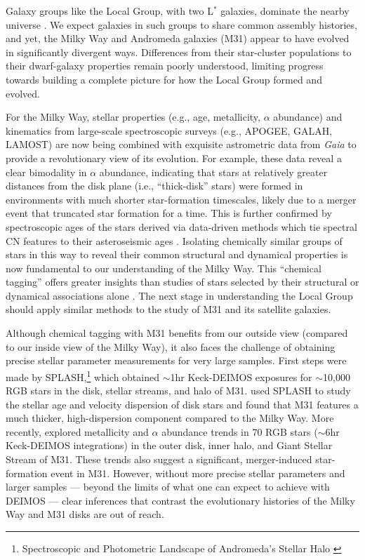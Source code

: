 \documentclass[11pt,a4paper,twoside,onecolumn,openany,final,oldfontcommands]{memoir}
\begin{document}
Galaxy groups like the Local Group, with two L$^*$ galaxies, dominate the nearby universe \citep{kourkchi17}.  We expect galaxies in such groups to share common assembly histories, and yet, the Milky Way and Andromeda galaxies (M31) appear to have evolved in significantly divergent ways.  Differences from their star-cluster populations to their dwarf-galaxy properties remain poorly understood, limiting progress towards building a complete picture for how the Local Group formed and evolved.

For the Milky Way, stellar properties (e.g., age, metallicity, $\alpha$ abundance) and kinematics from large-scale spectroscopic surveys (e.g., APOGEE, GALAH, LAMOST) are now being combined with exquisite astrometric data from \textit{Gaia} to provide a revolutionary view of its evolution.  For example, these data reveal a clear bimodality in $\alpha$ abundance, indicating that stars at relatively greater distances from the disk plane (i.e., ``thick-disk'' stars) were formed in environments with much shorter star-formation timescales, likely due to a merger event that truncated star formation for a time. This is further confirmed by spectroscopic ages of the stars derived via data-driven methods which tie spectral CN features to their asteroseismic ages \citep[e.g.][]{Martig16}.  Isolating chemically similar groups of stars in this way to reveal their common structural and dynamical properties is now fundamental to our understanding of the Milky Way.  This ``chemical tagging'' offers greater insights than studies of stars selected by their structural or dynamical associations alone \citep[e.g.,][]{Ting15}.  The next stage in understanding the Local Group should apply similar methods to the study of M31 and its satellite galaxies.

Although chemical tagging with M31 benefits from our outside view (compared to our inside view of the Milky Way), it also faces the challenge of obtaining precise stellar parameter measurements for very large samples.  First steps were made by SPLASH,\footnote{Spectroscopic and Photometric Landscape of Andromeda’s Stellar Halo \citep[e.g.][]{splash}} which obtained $\sim$1hr Keck-DEIMOS exposures for $\sim$10,000 RGB stars in the disk, stellar streams, and halo of M31.  \citet{dorman15} used SPLASH to study the stellar age and velocity dispersion of disk stars and found that M31 features a much thicker, high-dispersion component compared to the Milky Way.  More recently, \citet{escala20} explored metallicity and $\alpha$ abundance trends in 70 RGB stars ($\sim$6hr Keck-DEIMOS integrations) in the outer disk, inner halo, and Giant Stellar Stream of M31.  These trends also suggest a significant, merger-induced star-formation event in M31.  However, without more precise stellar parameters and larger samples --- beyond the limits of what one can expect to achieve with DEIMOS --- clear inferences that contrast the evolutionary histories of the Milky Way and M31 disks are out of reach.
\end{document}
